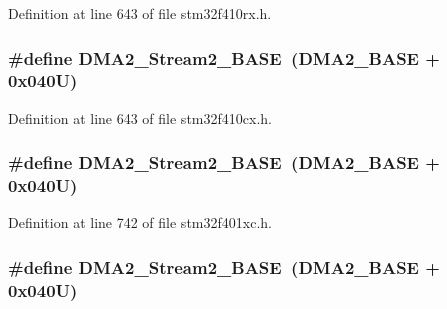 Definition at line 643 of file stm32f410rx.\+h.

\subsubsection[{\texorpdfstring{D\+M\+A2\+\_\+\+Stream2\+\_\+\+B\+A\+SE}{DMA2_Stream2_BASE}}]{\setlength{\rightskip}{0pt plus 5cm}\#define D\+M\+A2\+\_\+\+Stream2\+\_\+\+B\+A\+SE~({\bf D\+M\+A2\+\_\+\+B\+A\+SE} + 0x040\+U)}\hypertarget{group___peripheral__registers__structures_gaed33a06f08188466f2ede06160984e9a}{}\label{group___peripheral__registers__structures_gaed33a06f08188466f2ede06160984e9a}


Definition at line 643 of file stm32f410cx.\+h.

\subsubsection[{\texorpdfstring{D\+M\+A2\+\_\+\+Stream2\+\_\+\+B\+A\+SE}{DMA2_Stream2_BASE}}]{\setlength{\rightskip}{0pt plus 5cm}\#define D\+M\+A2\+\_\+\+Stream2\+\_\+\+B\+A\+SE~({\bf D\+M\+A2\+\_\+\+B\+A\+SE} + 0x040\+U)}\hypertarget{group___peripheral__registers__structures_gaed33a06f08188466f2ede06160984e9a}{}\label{group___peripheral__registers__structures_gaed33a06f08188466f2ede06160984e9a}


Definition at line 742 of file stm32f401xc.\+h.

\subsubsection[{\texorpdfstring{D\+M\+A2\+\_\+\+Stream2\+\_\+\+B\+A\+SE}{DMA2_Stream2_BASE}}]{\setlength{\rightskip}{0pt plus 5cm}\#define D\+M\+A2\+\_\+\+Stream2\+\_\+\+B\+A\+SE~({\bf D\+M\+A2\+\_\+\+B\+A\+SE} + 0x040\+U)}\hypertarget{group___peripheral__registers__structures_gaed33a06f08188466f2ede06160984e9a}{}\label{group___peripheral__registers__structures_gaed33a06f08188466f2ede06160984e9a}


